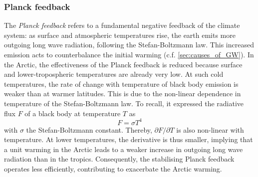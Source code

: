    \subsubsection{Planck feedback}
    The \textit{Planck feedback} refers to a fundamental negative feedback of the climate system: as surface and atmospheric temperatures rise, the earth emits more outgoing long wave radiation, following the Stefan\--Boltzmann law.
    This increased emission acts to counterbalance the initial warming (c.f. \cref{sec:causes_of_GW}). 
    In the Arctic, the effectiveness of the Planck feedback is reduced because surface and lower-tropospheric temperatures are already very low. At such cold temperatures, the rate of change with temperature of black body emission is weaker than at warmer latitudes. 
    This is due to the non-linear dependence in temperature of the Stefan\--Boltzmann law. To recall, it expressed the radiative flux $F$ of a black body at temperature $T$ as
    \begin{equation}
        F = \sigma T^4
    \end{equation}
    with $\sigma$ the Stefan\--Boltzmann constant.
    Thereby, $\partial F/\partial T$ is also non-linear with temperature. 
At lower temperatures, the derivative is thus smaller, implying that a unit warming in the Arctic leads to a weaker increase in outgoing long wave radiation than in the tropics. Consequently, the stabilising Planck feedback operates less efficiently, contributing to exacerbate the Arctic warming.

    
